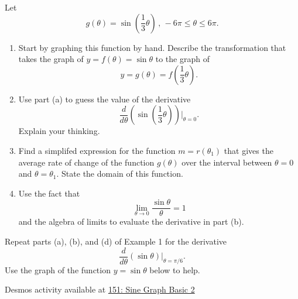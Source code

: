 \documentclass{ximera}
\begin{document}
\begin{example} \label{Exldf3r3ffs}
Let
\[
  g(\theta) = \sin \left( \frac{1}{3} \theta \right) \, , \, -6\pi \leq \theta \leq 6\pi.
\]

\begin{enumerate}

\item Start by graphing this function by hand. Describe the transformation that takes the graph of $y=f(\theta) = \sin\theta$ to the graph of 
\[
 y = g(\theta) = f\left(  \frac{1}{3}\theta \right).
\]

\item Use part (a) to guess the value of the derivative
\[
    \frac{d}{d\theta} \left( \sin \left(\frac{1}{3}\theta\right) \right)\Big|_{\theta = 0} .
\]
Explain your thinking.

\item Find a simplifed expression for the function $m=r(\theta_1)$ that gives the average rate of change of the function $g(\theta)$ over the interval between $\theta = 0$ and $\theta = \theta_1$. State the domain of this function.

\item Use the fact that
\[
 \lim_{\theta\to 0} \frac{\sin\theta}{\theta} = 1
\]
and the algebra of limits to evaluate the derivative in part (b).

\end{enumerate}
\end{example}



\begin{example} \label{ExMf90923111}

Repeat parts (a), (b), and (d) of Example 1 for the derivative
\[
    \frac{d}{d\theta} \left( \sin \theta \right)\Big|_{\theta = \pi/6}.
\]
Use the graph of the function $y=\sin\theta$ below to help. 


\begin{onlineOnly}
    \begin{center}
\end{center}
\end{onlineOnly}

Desmos activity available at
\href{https://www.desmos.com/calculator/bf2ic534ik}{151: Sine Graph Basic 2}

\end{example}
\end{document}
